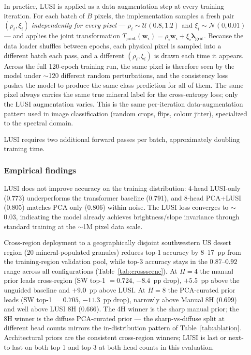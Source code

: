 \documentclass[preprint,12pt]{elsarticle}
\begin{document}
In practice, LUSI is applied as a data-augmentation step at every training iteration. For each batch of $B$ pixels, the implementation samples a fresh pair $(\rho_i, \xi_i)$ \emph{independently for every pixel} --- $\rho_i \sim \mathcal{U}(0.8, 1.2)$ and $\xi_i \sim \mathcal{N}(0, 0.01)$ --- and applies the joint transformation $T_{\text{joint}}(\mathbf{w}_i) = \rho_i \mathbf{w}_i + \xi_i \boldsymbol{\lambda}_{\text{grid}}$. Because the data loader shuffles between epochs, each physical pixel is sampled into a different batch each pass, and a different $(\rho_i, \xi_i)$ is drawn each time it appears. Across the full 120-epoch training run, the same pixel is therefore seen by the model under $\sim$120 different random perturbations, and the consistency loss pushes the model to produce the same class prediction for all of them. The same pixel always carries the same true mineral label for the cross-entropy loss; only the LUSI augmentation varies. This is the same per-iteration data-augmentation pattern used in image classification (random crops, flips, colour jitter), specialized to the spectral domain.

LUSI requires two additional forward passes per batch, approximately doubling training time.

\subsubsection{Empirical findings}
\label{sec:lusi_findings}

LUSI does not improve accuracy on the training distribution: 4-head LUSI-only (0.773) underperforms the transformer baseline (0.791), and 8-head PCA+LUSI (0.805) matches PCA-only (0.806) within noise.
The LUSI loss converges to $\sim$0.03, indicating the model already achieves brightness/slope invariance through standard training at the $\sim$1M pixel data scale.

Cross-region deployment to a geographically disjoint southwestern US desert region (20 mineral-populated granules) reduces top-1 accuracy by $8$--$17$~pp from the training-region validation pool, while top-3 accuracy stays in the $0.87$--$0.92$ range across all configurations (Table~\ref{tab:crossscene}). At $H = 4$ the manual prior leads cross-region (SW top-1 $= 0.724$, $-8.4$~pp drop), $+5.5$~pp above the unguided baseline and $+9.0$~pp above LUSI. At $H = 8$ the PCA-curated prior leads (SW top-1 $= 0.705$, $-11.3$~pp drop), narrowly above Manual 8H ($0.699$) and well above LUSI 8H ($0.666$). The 4H winner is the sharp manual prior; the 8H winner is the diffuse PCA-curated prior --- the sharp-vs-diffuse split at different head counts mirrors the in-distribution pattern of Table~\ref{tab:ablation}. Architectural priors are the consistent cross-region winners; LUSI is last or next-to-last on both top-1 and top-3 at both head counts in this evaluation.
\end{document}
